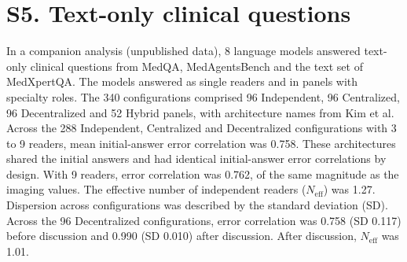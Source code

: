 \documentclass[preprint,12pt]{elsarticle}
\begin{document}
\section*{S5. Text-only clinical questions}
In a companion analysis (unpublished data), 8 language models answered text-only clinical questions from MedQA, MedAgentsBench and the text set of MedXpertQA. The models answered as single readers and in panels with specialty roles. The 340 configurations comprised 96 Independent, 96 Centralized, 96 Decentralized and 52 Hybrid panels, with architecture names from Kim et al.\cite{kim2026scaling} Across the 288 Independent, Centralized and Decentralized configurations with 3 to 9 readers, mean initial-answer error correlation was 0.758. These architectures shared the initial answers and had identical initial-answer error correlations by design. With 9 readers, error correlation was 0.762, of the same magnitude as the imaging values. The effective number of independent readers ($N_{\mathrm{eff}}$) was 1.27. Dispersion across configurations was described by the standard deviation (SD). Across the 96 Decentralized configurations, error correlation was 0.758 (SD 0.117) before discussion and 0.990 (SD 0.010) after discussion. After discussion, $N_{\mathrm{eff}}$ was 1.01.



\end{document}

